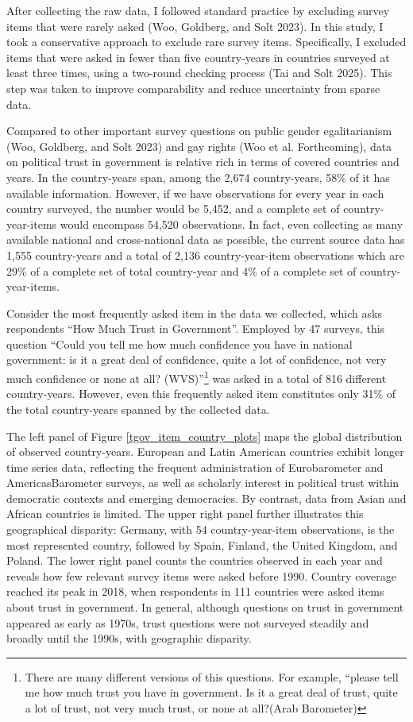 \documentclass[
  12pt,
]{article}
\begin{document}
After collecting the raw data, I followed standard practice by excluding survey items that were rarely asked (Woo, Goldberg, and Solt 2023).
In this study, I took a conservative approach to exclude rare survey items.
Specifically, I excluded items that were asked in fewer than five country-years in countries surveyed at least three times, using a two-round checking process (Tai and Solt 2025).
This step was taken to improve comparability and reduce uncertainty from sparse data.

Compared to other important survey questions on public gender egalitarianism (Woo, Goldberg, and Solt 2023) and gay rights (Woo et al. Forthcoming), data on political trust in government is relative rich in terms of covered countries and years.
In the country-years span, among the 2,674 country-years, 58\% of it has available information.
However, if we have observations for every year in each country surveyed, the number would be 5,452, and a complete set of country-year-items would encompass 54,520 observations.
In fact, even collecting as many available national and cross-national data as possible, the current source data has 1,555 country-years and a total of 2,136 country-year-item observations which are 29\% of a complete set of total country-year and 4\% of a complete set of country-year-items.

Consider the most frequently asked item in the data we collected, which asks respondents ``How Much Trust in Government''.
Employed by 47 surveys, this question ``Could you tell me how much confidence you have in national government: is it a great deal of confidence, quite a lot of confidence, not very much confidence or none at all? (WVS)''\footnote{There are many different versions of this questions. For example, ``please tell me how much trust you have in government. Is it a great deal of trust, quite a lot of trust, not very much trust, or none at all?(Arab Barometer)} was asked in a total of 816 different country-years.
However, even this frequently asked item constitutes only 31\% of the total country-years spanned by the collected data.

The left panel of Figure \nobreakspace{}\ref{tgov_item_country_plots} maps the global distribution of observed country-years.
European and Latin American countries exhibit longer time series data, reflecting the frequent administration of Eurobarometer and AmericasBarometer surveys, as well as scholarly interest in political trust within democratic contexts and emerging democracies.
By contrast, data from Asian and African countries is limited.
The upper right panel further illustrates this geographical disparity: Germany, with 54 country-year-item observations, is the most represented country, followed by Spain, Finland, the United Kingdom, and Poland.
The lower right panel counts the countries observed in each year and reveals how few relevant survey items were asked before 1990.
Country coverage reached its peak in 2018, when respondents in 111 countries were asked items about trust in government.
In general, although questions on trust in government appeared as early as 1970s, trust questions were not surveyed steadily and broadly until the 1990s, with geographic disparity.
\end{document}
